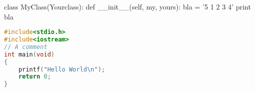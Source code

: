 \documentclass[a4paper,15pt]{article}
\begin{document}
\begin{python}
class MyClass(Yourclass):
    def __init__(self, my, yours):
        bla = '5 1 2 3 4'
        print bla
\end{python}

\begin{lstlisting}[language=C++, style=cppStyle]
#include<stdio.h>
#include<iostream>
// A comment
int main(void)
{
    printf("Hello World\n");
    return 0;
}
\end{lstlisting}
\end{document}
